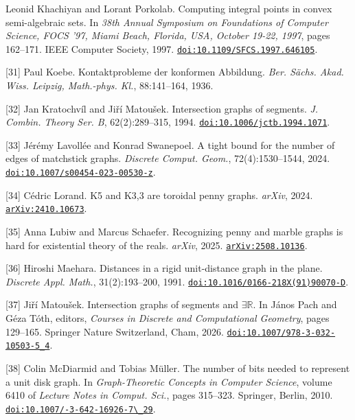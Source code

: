\documentclass{article}
\begin{document}
\begin{hangpars}
[30] Leonid Khachiyan and Lorant Porkolab. Computing integral points in convex semi-algebraic sets. In \emph{38th Annual Symposium on Foundations of Computer Science, FOCS ’97, Miami Beach, Florida, USA, October 19-22, 1997}, pages 162–171. IEEE Computer Society, 1997. \href{https://doi.org/10.1109/SFCS.1997.646105}{\nolinkurl{doi:10.1109/SFCS.1997.646105}}.

[31] Paul Koebe. Kontaktprobleme der konformen Abbildung. \emph{Ber. Sächs. Akad. Wiss. Leipzig, Math.-phys. Kl.}, 88:141–164, 1936.

[32] Jan Kratochvíl and Jiří Matoušek. Intersection graphs of segments. \emph{J. Combin. Theory Ser. B}, 62(2):289–315, 1994. \href{https://doi.org/10.1006/jctb.1994.1071}{\nolinkurl{doi:10.1006/jctb.1994.1071}}.

[33] Jérémy Lavollée and Konrad Swanepoel. A tight bound for the number of edges of matchstick graphs. \emph{Discrete Comput. Geom.}, 72(4):1530–1544, 2024. \href{https://doi.org/10.1007/s00454-023-00530-z}{\nolinkurl{doi:10.1007/s00454-023-00530-z}}.

[34] Cédric Lorand. K5 and K3,3 are toroidal penny graphs. \emph{arXiv}, 2024. \href{https://arxiv.org/abs/2410.10673}{\nolinkurl{arXiv:2410.10673}}.

[35] Anna Lubiw and Marcus Schaefer. Recognizing penny and marble graphs is hard for existential theory of the reals. \emph{arXiv}, 2025. \href{https://arxiv.org/abs/2508.10136}{\nolinkurl{arXiv:2508.10136}}.

[36] Hiroshi Maehara. Distances in a rigid unit-distance graph in the plane. \emph{Discrete Appl. Math.}, 31(2):193–200, 1991. \href{https://doi.org/10.1016/0166-218X(91)90070-D}{\nolinkurl{doi:10.1016/0166-218X(91)90070-D}}.

[37] Jiří Matoušek. Intersection graphs of segments and $\exists\mathbb{R}$. In János Pach and Géza Tóth, editors, \emph{Courses in Discrete and Computational Geometry}, pages 129–165. Springer Nature Switzerland, Cham, 2026. \href{https://doi.org/10.1007/978-3-032-10503-5_4}{\nolinkurl{doi:10.1007/978-3-032-10503-5_4}}.

[38] Colin McDiarmid and Tobias Müller. The number of bits needed to represent a unit disk graph. In \emph{Graph-Theoretic Concepts in Computer Science}, volume 6410 of \emph{Lecture Notes in Comput. Sci.}, pages 315–323. Springer, Berlin, 2010. \href{https://doi.org/10.1007/978-3-642-16926-7_29}{\texttt{doi:10.1007/-3-642-16926-7\textbackslash\_29}}.


\end{hangpars}
\end{document}
